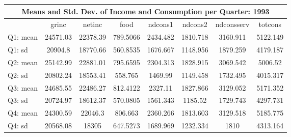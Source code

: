 \begin{tabular}{l*{7}{c}}
\hline\hline
\multicolumn{8}{c}{Means and Std. Dev. of Income and Consumption per Quarter: 1993}  \\
\hline    
            &       grinc&      netinc&        food&     ndcons1&     ndcons2&  ndconsserv&     totcons\\
\hline
Q1: mean     &    24571.03&    22378.39&    789.5066&    2434.482&    1810.718&    3160.911&    5122.149\\
Q1: sd    &     20904.8&    18770.66&    560.8535&    1676.667&    1148.956&    1879.259&    4179.187\\
Q2: mean    &    25142.99&    22881.01&    795.6595&    2304.313&    1828.915&    3069.542&     5006.52\\
Q2: sd   &    20802.24&    18553.41&     558.765&     1469.99&    1149.458&    1732.495&    4015.317\\
Q3: mean      &    24685.55&    22486.27&    812.4122&     2327.11&    1827.866&    3129.052&    5171.352\\
Q3: sd      &    20724.97&    18612.37&    570.0805&    1561.343&     1185.52&    1729.743&    4297.731\\
Q4: mean       &    24300.59&     22046.3&     806.663&    2360.266&    1813.603&    3129.518&    5185.775\\
Q4: sd    &    20568.08&       18305&    647.5273&    1689.969&    1232.334&        1810&    4313.164\\
\hline\hline
\end{tabular}
